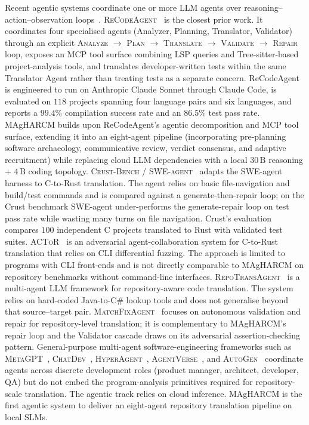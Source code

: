 Recent agentic systems coordinate one or more LLM agents over
reasoning--action--observation loops~\cite{yao2023react}.
\textsc{ReCodeAgent}~\cite{ibrahimzada2026recodeagent,p01_recodeagent}
is the closest prior work. It coordinates four specialised agents
(Analyzer, Planning, Translator, Validator) through an explicit
\textsc{Analyze} $\to$ \textsc{Plan} $\to$ \textsc{Translate} $\to$
\textsc{Validate} $\to$ \textsc{Repair} loop, exposes an MCP tool
surface combining LSP queries and Tree-sitter-based project-analysis
tools, and translates developer-written tests within the same
Translator Agent rather than treating tests as a separate concern.
ReCodeAgent is engineered to run on Anthropic Claude Sonnet through
Claude Code, is evaluated on $118$ projects spanning four language
pairs and six languages, and reports a $99.4\%$ compilation success
rate and an $86.5\%$ test pass rate. MAgHARCM builds upon ReCodeAgent's
agentic decomposition and MCP tool surface, extending it into an
eight-agent pipeline (incorporating pre-planning software archaeology,
communicative review, verdict consensus, and adaptive recruitment)
while replacing cloud LLM dependencies with a local $30\,\text{B}$ reasoning +
$4\,\text{B}$ coding topology. \textsc{Crust-Bench} / \textsc{SWE-agent}~\cite{p30_crust_bench,yang2024sweagent}
adapts the SWE-agent harness to C-to-Rust translation. The agent
relies on basic file-navigation and build/test commands and is
compared against a generate-then-repair loop; on the Crust benchmark
SWE-agent under-performs the generate-repair loop on test pass rate
while wasting many turns on file navigation. Crust's evaluation
compares $100$ independent C projects translated to Rust with
validated test suites. \textsc{ACToR}~\cite{p31_actor} is an
adversarial agent-collaboration system for C-to-Rust translation
that relies on CLI differential fuzzing. The approach is limited to
programs with CLI front-ends and is not directly comparable to
MAgHARCM on repository benchmarks without command-line interfaces.
\textsc{RepoTransAgent}~\cite{p62_repograph,p52_repotransagent} is a
multi-agent LLM framework for repository-aware code translation. The
system relies on hard-coded Java-to-C\# lookup tools and does not
generalise beyond that source--target pair.
\textsc{MatchFixAgent}~\cite{p08_matchfixagent} focuses on autonomous
validation and repair for repository-level translation; it is
complementary to MAgHARCM's repair loop and the Validator cascade
draws on its adversarial assertion-checking pattern. General-purpose
multi-agent software-engineering frameworks such as
\textsc{MetaGPT}~\cite{hong2023metagpt,p11_metagpt},
\textsc{ChatDev}~\cite{qian2023chatdev,p12_chatdev},
\textsc{HyperAgent}~\cite{p13_hyperagent,p47_hyperagent_deepread},
\textsc{AgentVerse}~\cite{p26_agentverse}, and
\textsc{AutoGen}~\cite{p16_autogen,p48_autogen_deepread} coordinate
agents across discrete development roles (product manager, architect,
developer, QA) but do not embed the program-analysis primitives
required for repository-scale translation. The agentic track
relies on cloud inference. MAgHARCM is the first agentic system to
deliver an eight-agent repository translation pipeline on local SLMs.
